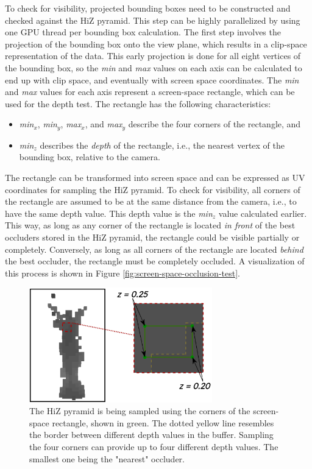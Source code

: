 \noindent
To check for visibility, projected bounding boxes need to be constructed and checked against the 
\ac{HiZ} pyramid. This step can be highly parallelized by using one \ac{GPU} thread per bounding box 
calculation. The first step involves the projection of the bounding box onto the view plane, which results 
in a clip-space representation of the data. This early projection is done for all eight vertices of the 
bounding box, so the \emph{min} and \emph{max} values on each axis can be calculated to end up with clip space, 
and eventually with screen space coordinates. The \emph{min} and \emph{max} values for each axis represent 
a screen-space rectangle, which can be used for the depth test. The rectangle has the following characteristics:

\begin{itemize}
    \item \emph{min$_{x}$}, \emph{min$_{y}$}, \emph{max$_{x}$}, and \emph{max$_{y}$} describe the four corners of the rectangle, and
    \item \emph{min$_{z}$} describes the \emph{depth} of the rectangle, i.e., the nearest vertex of the bounding box, relative to the camera.
\end{itemize}

\noindent
The rectangle can be transformed into screen space and can be expressed as UV coordinates for sampling the 
\ac{HiZ} pyramid. To check for visibility, all corners of the rectangle are assumed to be at the same distance 
from the camera, i.e., to have the same depth value. This depth value is the \emph{min$_{z}$} value calculated earlier.
This way, as long as any corner of the rectangle is located \emph{in front} of the best occluders stored in the 
\ac{HiZ} pyramid, the rectangle could be visible partially or completely. Conversely, as long as all corners of 
the rectangle are located \emph{behind} the best occluder, the rectangle must be completely occluded. A visualization of 
this process is shown in Figure \ref{fig:screen-space-occlusion-test}. \\

\begin{figure}[htbp]
    \centering
    \includegraphics[width=300px]{images/graphics/visibility-hiz-sampling.jpg}
    \caption{The \ac{HiZ} pyramid is being sampled using the corners of the screen-space rectangle, shown in green. 
    The dotted yellow line resembles the border between different depth values in the buffer. Sampling the four 
    corners can provide up to four different depth values. The smallest one being the "nearest" occluder.}
    \label{fig:visibility-hiz-sampling}
\end{figure}


